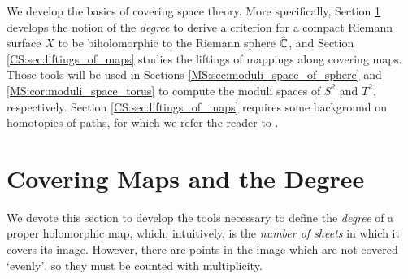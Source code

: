\documentclass[../Moduli_Spaces_of_Riemann_Surfaces.tex]{subfiles}
\begin{document}
    We develop the basics of covering space theory. More specifically, Section \ref{CS:sec:covering_maps_degree} develops the notion of the \textit{degree} to derive a criterion for a compact Riemann surface $X$ to be biholomorphic to the Riemann sphere $\hat{\mathbb{C}}$, and Section \ref{CS:sec:liftings_of_maps} studies the liftings of mappings along covering maps. Those tools will be used in Sections \ref{MS:sec:moduli_space_of_sphere} and \ref{MS:cor:moduli_space_torus} to compute the moduli spaces of $S^2$ and $T^2$, respectively. Section \ref{CS:sec:liftings_of_maps} requires some background on homotopies of paths, for which we refer the reader to \cite[][Chapter 1]{hatcher}.
    \section{Covering Maps and the Degree}\label{CS:sec:covering_maps_degree}
    We devote this section to develop the tools necessary to define the \textit{degree} of a proper holomorphic map, which, intuitively, is the \textit{number of sheets} in which it covers its image. However, there are points in the image which are not covered `evenly', so they must be counted with multiplicity.
\end{document}
